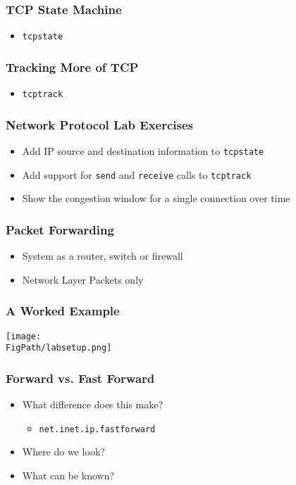 \documentclass[pdftex]{beamer}
\begin{document}
\begin{frame}[fragile]
  \frametitle{TCP State Machine}
  \begin{itemize}
  \item \verb|tcpstate|
  \end{itemize}
\end{frame}

\begin{frame}[fragile]
  \frametitle{Tracking More of TCP}
  \begin{itemize}
  \item \verb|tcptrack|
  \end{itemize}
\end{frame}

\begin{frame}[fragile]
  \frametitle{Network Protocol Lab Exercises}
  \begin{itemize}
  \item Add IP source and destination information to \verb+tcpstate+
  \item Add support for \verb+send+ and \verb+receive+ calls to \verb+tcptrack+
  \item Show the congestion window for a single connection over time
  \end{itemize}
\end{frame}

\begin{frame}
  \frametitle{Packet Forwarding}
  \begin{itemize}
  \item System as a router, switch or firewall
  \item Network Layer Packets only
  \end{itemize}
\end{frame}

\begin{frame}
  \frametitle{A Worked Example}
      \texttt{[image: \\FigPath/labsetup.png]}
\end{frame}

\begin{frame}[fragile]
  \frametitle{Forward vs. Fast Forward}
  \begin{itemize}
  \item What difference does this make?
    \begin{itemize}
    \item \verb+net.inet.ip.fastforward+
    \end{itemize}
  \item Where do we look?
  \item What can be known?
  \end{itemize}
\end{frame}
\end{document}
